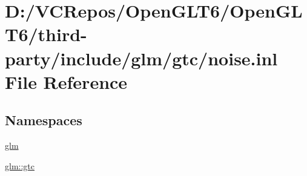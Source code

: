 \hypertarget{noise_8inl}{}\section{D\+:/\+V\+C\+Repos/\+Open\+G\+L\+T6/\+Open\+G\+L\+T6/third-\/party/include/glm/gtc/noise.inl File Reference}
\label{noise_8inl}
\subsection*{Namespaces}
\begin{DoxyCompactItemize}
\item 
 \mbox{\hyperlink{namespaceglm}{glm}}
\item 
 \mbox{\hyperlink{namespaceglm_1_1gtc}{glm\+::gtc}}
\end{DoxyCompactItemize}
